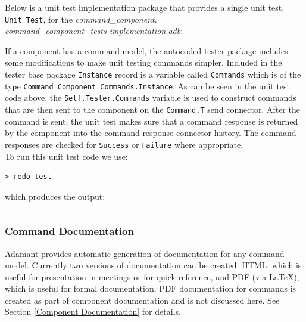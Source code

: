 Below is a unit test implementation package that provides a single unit test, \texttt{Unit\_Test}, for the \textit{command\_component}. \\

\textit{command\_component\_tests-implementation.adb}:

If a component has a command model, the autocoded tester package includes some modifications to make unit testing commands simpler. Included in the tester base package \texttt{Instance} record is a variable called \texttt{Commands} which is of the type \texttt{Command\_Component\_Commands.Instance}. As can be seen in the unit test code above, the \texttt{Self.Tester.Commands} variable is used to construct commands that are then sent to the component on the \texttt{Command.T} send connector. After the command is sent, the unit test makes sure that a command response is returned by the component into the command response connector history. The command responses are checked for \texttt{Success} or \texttt{Failure} where appropriate. \\

To run this unit test code we use:

\vspace{5mm} %
\begin{verbatim}
> redo test
\end{verbatim}
\vspace{5mm} %

which produces the output:

\vspace{5mm} %
\inputminted{text}{../example_architecture/command_component/test/output.txt}
\vspace{5mm} %

\subsubsection{Command Documentation}

Adamant provides automatic generation of documentation for any command model. Currently two versions of documentation can be created: HTML, which is useful for presentation in meetings or for quick reference, and PDF (via \LaTeX), which is useful for formal documentation. PDF documentation for commands is created as part of component documentation and is not discussed here. See Section \ref{Component Documentation} for details. \\

